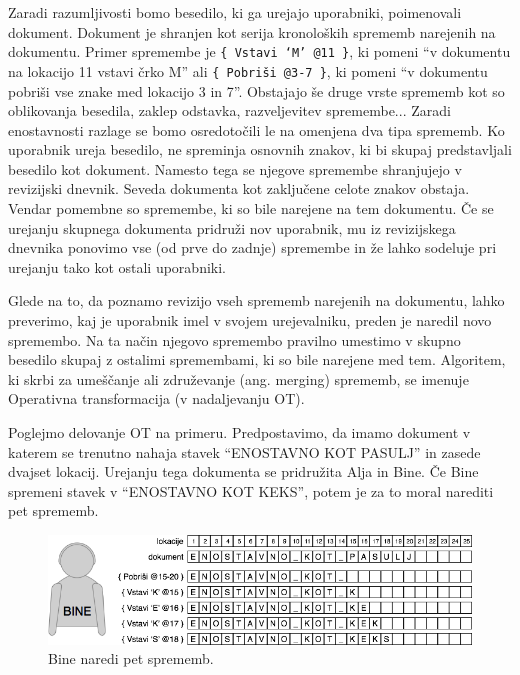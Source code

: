 \documentclass[a4paper, 12pt, twoside]{book}
\begin{document}
Zaradi razumljivosti bomo besedilo, ki ga urejajo uporabniki, poimenovali dokument. Dokument je shranjen kot serija kronoloških sprememb narejenih na dokumentu. Primer spremembe je {\tt \{ Vstavi ‘M’ @11 \}}, ki pomeni “v dokumentu na lokacijo 11 vstavi črko M” ali {\tt \{ Pobriši @3-7 \}}, ki pomeni “v dokumentu pobriši vse znake med lokacijo 3 in 7”. Obstajajo še druge vrste sprememb kot so oblikovanja besedila, zaklep odstavka, razveljevitev spremembe... Zaradi enostavnosti razlage se bomo osredotočili le na omenjena dva tipa sprememb. Ko uporabnik ureja besedilo, ne spreminja osnovnih znakov, ki bi skupaj predstavljali besedilo kot dokument. Namesto tega se njegove spremembe shranjujejo v revizijski dnevnik. Seveda dokumenta kot zaključene celote znakov obstaja. Vendar pomembne so spremembe, ki so bile narejene na tem dokumentu. Če se urejanju skupnega dokumenta pridruži nov uporabnik, mu iz revizijskega dnevnika ponovimo vse (od prve do zadnje) spremembe in že lahko sodeluje pri urejanju tako kot ostali uporabniki.

Glede na to, da poznamo revizijo vseh sprememb narejenih na dokumentu, lahko preverimo, kaj je uporabnik imel v svojem urejevalniku, preden je naredil novo spremembo. Na ta način njegovo spremembo pravilno umestimo v skupno besedilo skupaj z ostalimi spremembami, ki so bile narejene med tem. Algoritem, ki skrbi za umeščanje ali združevanje (ang. merging) sprememb, se imenuje Operativna transformacija (v nadaljevanju OT).

\bigskip

Poglejmo delovanje OT na primeru. Predpostavimo, da imamo dokument v katerem se trenutno nahaja stavek “ENOSTAVNO KOT PASULJ” in zasede dvajset lokacij. Urejanju tega dokumenta se pridružita Alja in Bine. Če Bine spremeni stavek v “ENOSTAVNO KOT KEKS”, potem je za to moral narediti pet sprememb.

\begin{figure}[placement h]
\begin{center}
\includegraphics[width=12cm]{ot1.png}
\end{center}
\caption{Bine naredi pet sprememb.}
\label{ot1}
\end{figure}
\end{document}
